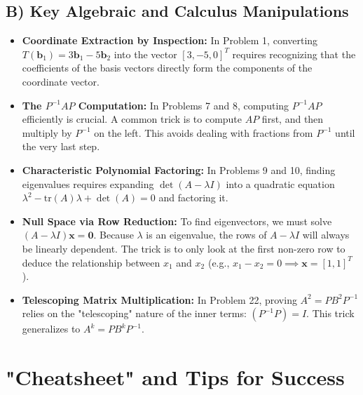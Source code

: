 \documentclass[11pt, a4paper]{article}
\theoremstyle{definition}
\theoremstyle{remark}
\begin{document}
\subsection{B) Key Algebraic and Calculus Manipulations}
\begin{itemize}
    \item \textbf{Coordinate Extraction by Inspection:} In Problem 1, converting $T(\mathbf{b}_1) = 3\mathbf{b}_1 - 5\mathbf{b}_2$ into the vector $[3, -5, 0]^T$ requires recognizing that the coefficients of the basis vectors directly form the components of the coordinate vector.
    \item \textbf{The $P^{-1}AP$ Computation:} In Problems 7 and 8, computing $P^{-1}AP$ efficiently is crucial. A common trick is to compute $AP$ first, and then multiply by $P^{-1}$ on the left. This avoids dealing with fractions from $P^{-1}$ until the very last step.
    \item \textbf{Characteristic Polynomial Factoring:} In Problems 9 and 10, finding eigenvalues requires expanding $\det(A - \lambda I)$ into a quadratic equation $\lambda^2 - \text{tr}(A)\lambda + \det(A) = 0$ and factoring it.
    \item \textbf{Null Space via Row Reduction:} To find eigenvectors, we must solve $(A - \lambda I)\mathbf{x} = \mathbf{0}$. Because $\lambda$ is an eigenvalue, the rows of $A - \lambda I$ will always be linearly dependent. The trick is to only look at the first non-zero row to deduce the relationship between $x_1$ and $x_2$ (e.g., $x_1 - x_2 = 0 \implies \mathbf{x} = [1, 1]^T$).
    \item \textbf{Telescoping Matrix Multiplication:} In Problem 22, proving $A^2 = PB^2P^{-1}$ relies on the "telescoping" nature of the inner terms: $(P^{-1}P) = I$. This trick generalizes to $A^k = PB^kP^{-1}$.
\end{itemize}

\newpage
\section{"Cheatsheet" and Tips for Success}
\end{document}
